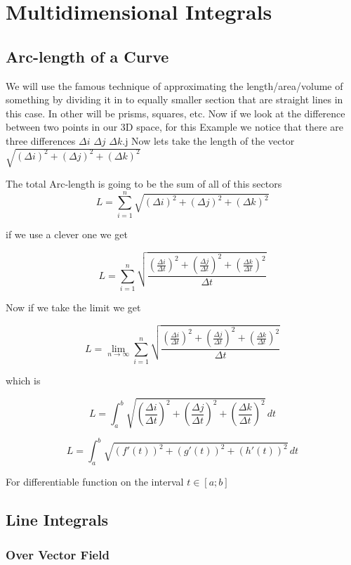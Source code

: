 \newpage
\section{Multidimensional Integrals}

\subsection{Arc-length of a Curve}

We will use the famous technique of approximating the length/area/volume of something
by dividing it in to equally smaller section that are straight lines in this case. In other will
be prisms, squares, etc. Now if we look at the difference between two points in our 3D space, 
for this Example
we notice that there are three differences \(\Delta i\) \(\Delta j\) \(\Delta k\).j
Now lets take the length of the vector \(\sqrt{{(\Delta i)}^2 + {(\Delta j)}^2 + {(\Delta k)}^2}\)

The total Arc-length is going to be the sum of all of this sectors
\[
L =  \sum_{i = 1}^{n}\sqrt{{(\Delta i)}^2 + {(\Delta j)}^2 + {(\Delta k)}^2}
\]

if we use a clever one we get

\[
L =  \sum_{i = 1}^{n}\sqrt{\frac{{\left(\frac{\Delta i}{\Delta t}\right)}^2 + {\left(\frac{\Delta j}{\Delta t}\right)}^2 + {\left(\frac{\Delta k}{\Delta t}\right)}^2}{\Delta t}}
\]

Now if we take the limit we get

\[
L =  \lim_{n\to \infty}\sum_{i = 1}^{n}\sqrt{\frac{{\left(\frac{\Delta i}{\Delta t}\right)}^2 + {\left(\frac{\Delta j}{\Delta t}\right)}^2 + {\left(\frac{\Delta k}{\Delta t}\right)}^2}{\Delta t}}
\]

which is 

\[
L =  \int_{a}^{b}\sqrt{{\left(\frac{\Delta i}{\Delta t}\right)}^2 + {\left(\frac{\Delta j}{\Delta t}\right)}^2 + {\left(\frac{\Delta k}{\Delta t}\right)}^2}\,dt
\]

\[
L =  \int_{a}^{b}\sqrt{{(f'(t))}^2 + {(g'(t))}^2 + {(h'(t))}^2}\,dt
\]

For differentiable function on the interval \(t \in [a; b]\)

\subsection{Line Integrals}

\subsubsection{Over Vector Field}

